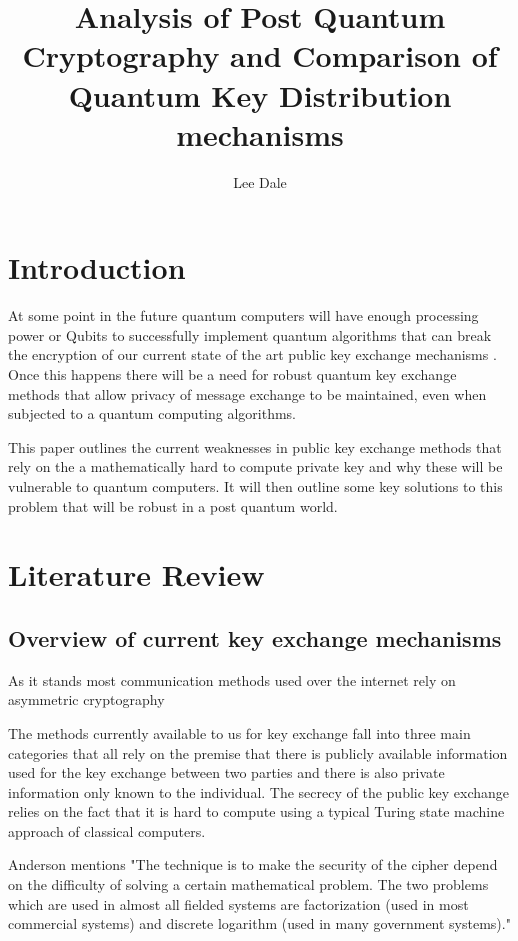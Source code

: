 \documentclass{article}
\title{Analysis of Post Quantum Cryptography and Comparison of Quantum Key Distribution mechanisms}
\author{Lee Dale}
\begin{document}
\maketitle

\section{Introduction}

At some point in the future quantum computers will have enough processing power or Qubits to successfully implement quantum algorithms that can break the encryption of our current state of the art public key exchange mechanisms \cite{Bellizia2021Post-QuantumDesign}. Once this happens there will be a need for robust quantum key exchange methods that allow privacy of message exchange to be maintained, even when subjected to a quantum computing algorithms. 

This paper outlines the current weaknesses in public key exchange methods that rely on the a mathematically hard to compute private key and why these will be vulnerable to quantum computers. It will then outline some key solutions to this problem that will be robust in a post quantum world. 

\section{Literature Review}

\subsection{Overview of current key exchange mechanisms}
As it stands most communication methods used over the internet rely on asymmetric cryptography

The methods currently available to us for key exchange fall into three main categories that all rely on the premise that there is publicly available information used for the key exchange between two parties and there is also private information only known to the individual. The secrecy of the public key exchange relies on the fact  that it is hard to compute using a typical Turing state machine approach of classical computers. 

Anderson mentions \cite{AndersonR2020} "The technique is to make the security of the cipher depend on the difficulty of solving a certain mathematical problem. The two problems which are used in almost all fielded systems are factorization (used in most commercial systems) and discrete logarithm (used in many government systems)." 
\end{document}
